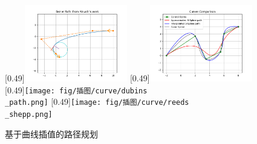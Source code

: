 \documentclass[master,academic]{ysuthesis} %
\begin{document}
		\begin{figure}[!ht]
			\centering
			[0.49\textwidth]{\includegraphics[width=0.4\textwidth]{fig/插图/curve/bezier.png}}
			[0.49\textwidth]{\includegraphics[width=0.4\textwidth]{fig/插图/curve/bspline.png}}
			[0.49\textwidth]{\texttt{[image: fig/插图/curve/dubins\\\_path.png]}}
			[0.49\textwidth]{\texttt{[image: fig/插图/curve/reeds\\\_shepp.png]}}
			\caption{基于曲线插值的路径规划}
			\label{fig:基于曲线插值的路径规划}
		\end{figure}
\end{document}

